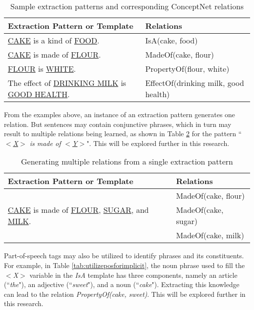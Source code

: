 \begin{table}[ht]   %
\centering
\caption{Sample extraction patterns and corresponding ConceptNet relations} \vspace{0.25em}
\begin{tabular}{|p{7cm}|l|} \hline
Extraction Pattern or Template & Relations \\ \hline
\underline{CAKE} is a kind of \underline{FOOD}. & IsA(cake, food) \\ \hline
\underline{CAKE} is made of \underline{FLOUR}. & MadeOf(cake, flour) \\ \hline
\underline{FLOUR} is \underline{WHITE}. & PropertyOf(flour, white) \\ \hline
The effect of \underline{DRINKING MILK} is \underline{GOOD HEALTH}. & EffectOf(drinking milk, good health) \\ \hline
\end{tabular}
\label{tab:patternsamples}
\end{table}

From the examples above, an instance of an extraction pattern generates one relation. But sentences may contain conjunctive phrases, which in turn may result to multiple relations being learned, as shown in Table \ref{tab:multiplerelationssingle} for the pattern ``\textit{\underline{$<$X$>$} is made of \underline{$<$Y$>$}}". This will be explored further in this research.

\begin{table}[ht]   %
\centering
\caption{Generating multiple relations from a single extraction pattern} \vspace{0.25em}
\begin{tabular}{|l|l|} \hline
Extraction Pattern or Template & Relations \\ \hline
\multirow{3}{*}{\underline{CAKE} is made of \underline{FLOUR}, \underline{SUGAR}, and \underline{MILK}.} & MadeOf(cake, flour) \\
 & MadeOf(cake, sugar) \\
 & MadeOf(cake, milk) \\ \hline
\end{tabular}
\label{tab:multiplerelationssingle}
\end{table}

Part-of-speech tags may also be utilized to identify phrases and its constituents. For example, in Table \ref{tab:utilizeposforimplicit}, the noun phrase used to fill the \textit{$<$X$>$} variable in the \textit{IsA} template has three components, namely an article (``\textit{the}"), an adjective (``\textit{sweet}"), and a noun (``\textit{cake}"). Extracting this knowledge can lead to the relation \textit{PropertyOf(cake, sweet)}. This will be explored further in this research.


